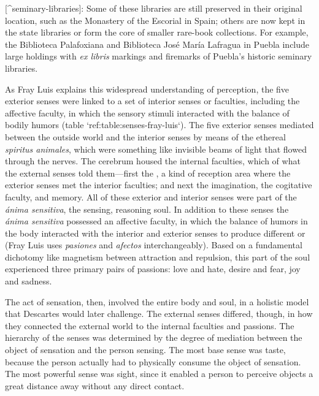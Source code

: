 [^seminary-libraries]: Some of these libraries are still preserved in their original location, such as the Monastery of the Escorial in Spain; others are now kept in the state libraries or form the core of smaller rare-book collections.
For example, the Biblioteca Palafoxiana and Biblioteca José María Lafragua in Puebla include large holdings with \emph{ex libris} markings and firemarks of Puebla's historic seminary libraries.


As Fray Luis explains this widespread understanding of perception, the five exterior senses were linked to a set of interior senses or faculties, including the affective faculty, in which the sensory stimuli interacted with the balance of bodily humors (table `ref:table:senses-fray-luis`).
\Autocite[ch.~27--35, pp.~439--494]{LuisdeGranada-Balcells:SimboloPtI}
The five exterior senses mediated between the outside world and the interior senses by means of the ethereal \emph{spiritus animales}, which were something like invisible beams of light that flowed through the nerves.
The cerebrum housed the internal faculties, which  of what the external senses told them---first the , a kind of reception area where the exterior senses met the interior faculties; and next the imagination, the cogitative faculty, and memory.
All of these exterior and interior senses were part of the \emph{ánima sensitiva}, the sensing, reasoning soul.
In addition to these senses the \emph{ánima sensitiva} possessed an affective faculty, in which the balance of humors in the body interacted with the interior and exterior senses to produce different  or  (Fray Luis uses \emph{pasiones} and \emph{afectos} interchangeably).
Based on a fundamental dichotomy like magnetism between attraction and repulsion, this  part of the soul experienced three primary pairs of passions: love and hate, desire and fear, joy and sadness.

\label{table:senses-fray-luis}

The act of sensation, then, involved the entire body and soul, in a holistic model that Descartes would later challenge.
The external senses differed, though, in how they connected the external world to the internal faculties and passions.
The hierarchy of the senses was determined by the degree of mediation between the object of sensation and the person sensing.
The most base sense was taste, because the person actually had to physically consume the object of sensation.
The most powerful sense was sight, since it enabled a person to perceive objects a great distance away without any direct contact.

